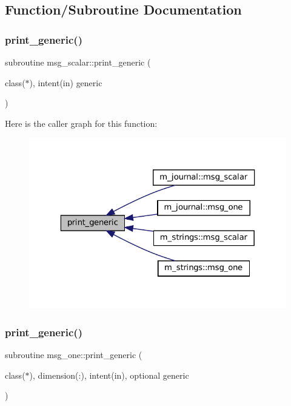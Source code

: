 \subsection{Function/\+Subroutine Documentation}
\mbox{\label{M__journal_8f90_aaa8ee15f943d8e1543ae35ab732c3cd2}} 
\subsubsection{\texorpdfstring{print\+\_\+generic()}{print\_generic()}\hspace{0.1cm}{\footnotesize\ttfamily [1/2]}}
{\footnotesize\ttfamily subroutine msg\+\_\+scalar\+::print\+\_\+generic (\begin{DoxyParamCaption}\item[{class($\ast$), intent(in)}]{generic }\end{DoxyParamCaption})\hspace{0.3cm}{\ttfamily [private]}}

Here is the caller graph for this function\+:\nopagebreak
\begin{figure}[H]
\begin{center}
\leavevmode
\includegraphics[width=323pt]{M__journal_8f90_aaa8ee15f943d8e1543ae35ab732c3cd2_icgraph}
\end{center}
\end{figure}
\mbox{\label{M__journal_8f90_a9d5e1620d474ac03a74eeb9b0f7d6ae1}} 
\subsubsection{\texorpdfstring{print\+\_\+generic()}{print\_generic()}\hspace{0.1cm}{\footnotesize\ttfamily [2/2]}}
{\footnotesize\ttfamily subroutine msg\+\_\+one\+::print\+\_\+generic (\begin{DoxyParamCaption}\item[{class($\ast$), dimension(\+:), intent(in), optional}]{generic }\end{DoxyParamCaption})\hspace{0.3cm}{\ttfamily [private]}}

